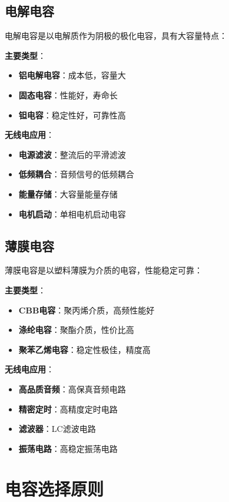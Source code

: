\documentclass[12pt,UTF8]{ctexbook}
\begin{document}
\subsection{电解电容}

电解电容是以电解质作为阴极的极化电容，具有大容量特点：

\textbf{主要类型}：
\begin{itemize}[leftmargin=3.5em]
    \item \textbf{铝电解电容}：成本低，容量大
    \item \textbf{固态电容}：性能好，寿命长
    \item \textbf{钽电容}：稳定性好，可靠性高
\end{itemize}

\textbf{无线电应用}：
\begin{itemize}[leftmargin=3.5em]
    \item \textbf{电源滤波}：整流后的平滑滤波
    \item \textbf{低频耦合}：音频信号的低频耦合
    \item \textbf{能量存储}：大容量能量存储
    \item \textbf{电机启动}：单相电机启动电容
\end{itemize}

\subsection{薄膜电容}

薄膜电容是以塑料薄膜为介质的电容，性能稳定可靠：

\textbf{主要类型}：
\begin{itemize}[leftmargin=3.5em]
    \item \textbf{CBB电容}：聚丙烯介质，高频性能好
    \item \textbf{涤纶电容}：聚酯介质，性价比高
    \item \textbf{聚苯乙烯电容}：稳定性极佳，精度高
\end{itemize}

\textbf{无线电应用}：
\begin{itemize}[leftmargin=3.5em]
    \item \textbf{高品质音频}：高保真音频电路
    \item \textbf{精密定时}：高精度定时电路
    \item \textbf{滤波器}：LC滤波电路
    \item \textbf{振荡电路}：高稳定振荡电路
\end{itemize}

\section{电容选择原则}
\end{document}
